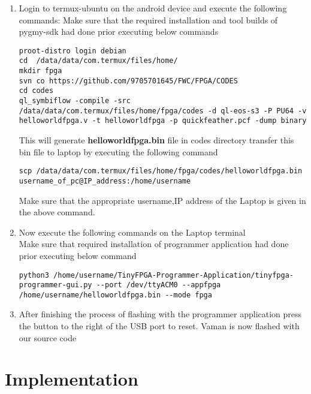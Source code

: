 \documentclass[10pt, a4paper]{article}
\begin{document}
\begin{enumerate}
\item Login to termux-ubuntu on the android device and execute the following commands:
\vspace{10mm}
Make sure that the required installation and tool builds of pygmy-sdk had done prior executing below commands\\

\begin{lstlisting}
proot-distro login debian
cd  /data/data/com.termux/files/home/
mkdir fpga
svn co https://github.com/9705701645/FWC/FPGA/CODES
cd codes
ql_symbiflow -compile -src /data/data/com.termux/files/home/fpga/codes -d ql-eos-s3 -P PU64 -v helloworldfpga.v -t helloworldfpga -p quickfeather.pcf -dump binary
\end{lstlisting}
This will generate \textbf{helloworldfpga.bin} file in codes directory transfer this bin file to laptop by executing the following command\\
\vspace{2mm}
\begin{lstlisting}
scp /data/data/com.termux/files/home/fpga/codes/helloworldfpga.bin username_of_pc@IP_address:/home/username
\end{lstlisting}
Make sure that the appropriate username,IP address of the Laptop is given in the above command.\\
\vspace{5mm}
\item Now execute the following commands on the Laptop terminal\\
Make sure that required installation of programmer application had done prior executing below command\\
\vspace{5mm}
\begin{lstlisting}
python3 /home/username/TinyFPGA-Programmer-Application/tinyfpga-programmer-gui.py --port /dev/ttyACM0 --appfpga /home/username/helloworldfpga.bin --mode fpga
\end{lstlisting}
\vspace{5mm}
\item After finishing the process of flashing with the programmer application press the button to the right of the USB port to reset. Vaman is now flashed with our source code
\end{enumerate}

\section{Implementation}
\end{document}
